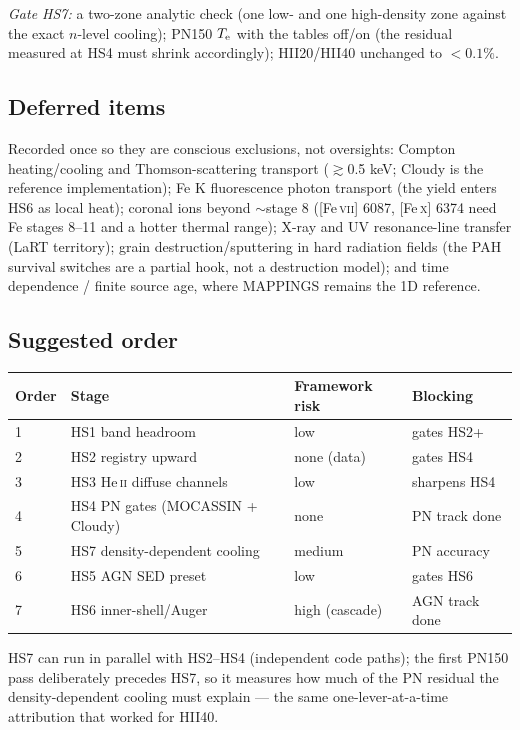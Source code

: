 \documentclass[english,a4paper]{my_memo}
\newcommand{\HeII}{He\,\textsc{ii}}
\newcommand{\Te}{T_{\rm e}}
\begin{document}
\emph{Gate HS7:} a two-zone analytic check (one low- and one
high-density zone against the exact $n$-level cooling); PN150 $\Te$
with the tables off/on (the residual measured at HS4 must shrink
accordingly); HII20/HII40 unchanged to $<0.1\%$.

\subsection{Deferred items}
\label{sec:harddeferred}

Recorded once so they are conscious exclusions, not oversights:
Compton heating/cooling and Thomson-scattering transport
($\gtrsim$0.5 keV; Cloudy is the reference implementation); Fe K
fluorescence photon transport (the yield enters HS6 as local heat);
coronal ions beyond $\sim$stage 8 ([Fe\,\textsc{vii}] 6087,
[Fe\,\textsc{x}] 6374 need Fe stages 8--11 and a hotter thermal range);
X-ray and UV resonance-line transfer (LaRT territory); grain
destruction/sputtering in hard radiation fields (the PAH survival
switches are a partial hook, not a destruction model); and time
dependence / finite source age, where MAPPINGS remains the 1D
reference.

\subsection{Suggested order}

\begin{center}\small
\begin{tabular}{P{0.06\textwidth}P{0.38\textwidth}P{0.20\textwidth}P{0.20\textwidth}}
\toprule
Order & Stage & Framework risk & Blocking \\
 & HS1 band headroom & low & gates HS2+ \\
2 & HS2 registry upward & none (data) & gates HS4 \\
3 & HS3 \HeII{} diffuse channels & low & sharpens HS4 \\
4 & HS4 PN gates (MOCASSIN + Cloudy) & none & PN track done \\
5 & HS7 density-dependent cooling & medium & PN accuracy \\
6 & HS5 AGN SED preset & low & gates HS6 \\
7 & HS6 inner-shell/Auger & high (cascade) & AGN track done \\
\bottomrule
\end{tabular}
\end{center}

HS7 can run in parallel with HS2--HS4 (independent code paths); the
first PN150 pass deliberately precedes HS7, so it measures how much of
the PN residual the density-dependent cooling must explain --- the same
one-lever-at-a-time attribution that worked for HII40.
\end{document}
